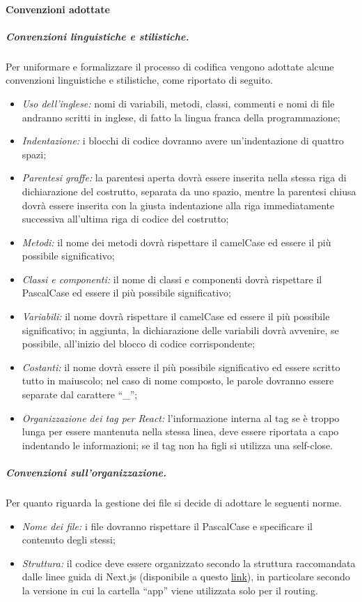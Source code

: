 \paragraph{Convenzioni adottate}\label{sec:codifica:convenzioni}
\subparagraph{Convenzioni linguistiche e stilistiche.}
Per uniformare e formalizzare il processo di codifica vengono adottate alcune convenzioni linguistiche e stilistiche, come riportato di seguito.
\begin{itemize}
    \item \textit{Uso dell'inglese:} nomi di variabili, metodi, classi, commenti e nomi di file andranno scritti in inglese, di fatto la lingua franca della programmazione;
    \item \textit{Indentazione:} i blocchi di codice dovranno avere un'indentazione di quattro spazi;
    \item \textit{Parentesi graffe:} la parentesi aperta dovrà essere inserita nella stessa riga di dichiarazione del costrutto, separata da uno spazio, mentre la parentesi chiusa dovrà essere inserita con la giusta indentazione alla riga immediatamente successiva all’ultima riga di codice del costrutto;
    \item \textit{Metodi:} il nome dei metodi dovrà rispettare il camelCase ed essere il più possibile significativo;
    \item \textit{Classi e componenti:} il nome di classi e componenti dovrà rispettare il PascalCase ed essere il più possibile significativo;
    \item \textit{Variabili:} il nome dovrà rispettare il camelCase ed essere il più possibile significativo; in aggiunta, la dichiarazione delle variabili dovrà avvenire, se possibile, all'inizio del blocco di codice corrispondente;
    \item \textit{Costanti:} il nome dovrà essere il più possibile significativo ed essere scritto tutto in maiuscolo; nel caso di nome composto, le parole dovranno essere separate dal carattere ``\_'';
    \item \textit{Organizzazione dei tag per React:} l'informazione interna al tag se è troppo lunga per essere mantenuta nella stessa linea, deve essere riportata a capo indentando le informazioni; se il tag non ha figli si utilizza una self-close.
\end{itemize}

\subparagraph{Convenzioni sull'organizzazione.} Per quanto riguarda la gestione dei file si decide di adottare le seguenti norme.
\begin{itemize}
    \item \textit{Nome dei file:} i file dovranno rispettare il PascalCase e specificare il contenuto degli stessi;
    \item \textit{Struttura:} il codice deve essere organizzato secondo la struttura raccomandata dalle linee guida di Next.js (disponibile a questo \href{https://nextjs.org/docs/app/building-your-application/routing/colocation#project-organization-features}{link}), in particolare secondo la versione in cui la cartella ``app'' viene utilizzata solo per il routing.
\end{itemize}

